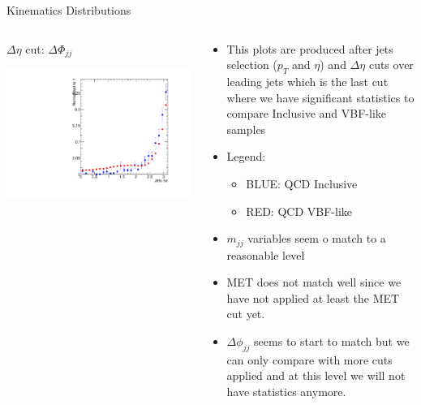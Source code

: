 \documentclass[8pt]{beamer}
\begin{document}
\begin{frame}{Kinematics Distributions}
\begin{columns}
\begin{block}{$\Delta\eta$ cut: $\Delta\Phi_{jj}$}
 
\centering
\includegraphics[width=\linewidth]{img/DEta_dphijj.pdf} 
 
\end{block}


\begin{block}
 
\begin{itemize}
  \item This plots are produced after jets selection ($p_{T}$ and $\eta$) and $\Delta\eta$ cuts over leading jets which is the last cut where we have
        significant statistics to compare Inclusive and VBF-like samples
  \item Legend:
  \begin{itemize}
    \item BLUE: QCD Inclusive
    \item RED: QCD VBF-like
  \end{itemize}
  \item $m_{jj}$ variables seem o match to a reasonable level
  \item MET does not match well since we have not applied at least the MET cut yet.
  \item $\Delta\phi_{jj}$ seems to start to match but we can only compare with more cuts applied and at this level we will not have statistics anymore.
\end{itemize}

\end{block}

\end{columns}

\end{frame}
\end{document}
